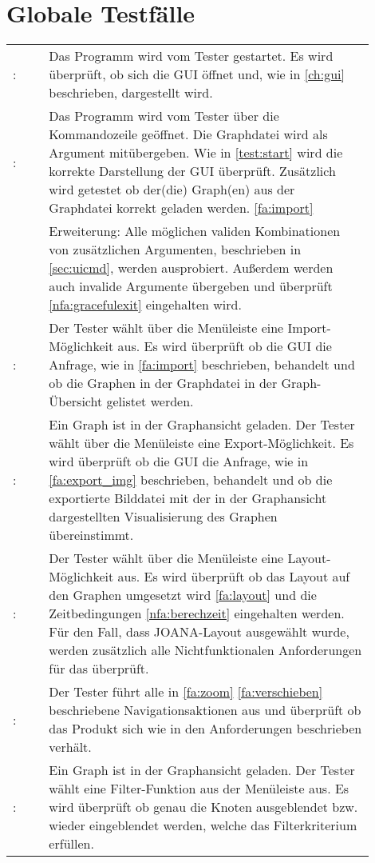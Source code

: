 \chapter{Globale Testfälle}

\setcounter{tnr}{10}
\newcommand{\testno}{\ifnum\value{tnr}<10 00\else\ifnum\value{tnr}<100 0\fi\fi\arabic{tnr}\addtocounter{tnr}{10}}
\newcommand\test[2]{\namedlabel{test:#1}{\textbf{/T\testno/}}: & #2 \\ [1ex] }
\newcommand\etest[3]{\namedlabel{test:#1}{\textbf{/T\testno/}}: & #2 \\ & Erweiterung: #3 \\ [1ex] }

\begin{tabular}{lp{0.9\linewidth}}
  \test{start}{Das Programm wird vom Tester gestartet.
    Es wird überprüft, ob sich die GUI öffnet und, wie in \ref{ch:gui} beschrieben, dargestellt wird.}
  \etest{startcmd}{Das Programm wird vom Tester über die Kommandozeile geöffnet.
    Die Graphdatei wird als Argument mitübergeben.
    Wie in \ref{test:start} wird die korrekte Darstellung der GUI überprüft.
    Zusätzlich wird getestet ob der(die) Graph(en) aus der Graphdatei korrekt geladen werden. \ref{fa:import}}
    {Alle möglichen validen Kombinationen von zusätzlichen Argumenten, beschrieben in \ref{sec:uicmd}, werden ausprobiert.
    Außerdem werden auch invalide Argumente übergeben und überprüft \ref{nfa:gracefulexit} eingehalten wird.}
  \test{import}{Der Tester wählt über die Menüleiste eine Import-Möglichkeit aus.
    Es wird überprüft ob die GUI die Anfrage, wie in \ref{fa:import} beschrieben,
    behandelt und ob die Graphen in der Graphdatei in der Graph-Übersicht gelistet werden.}
  \test{export}{Ein Graph ist in der Graphansicht geladen.
    Der Tester wählt über die Menüleiste eine Export-Möglichkeit.
    Es wird überprüft ob die GUI die Anfrage, wie in \ref{fa:export_img} beschrieben,
    behandelt und ob die exportierte Bilddatei mit der in der Graphansicht dargestellten Visualisierung des Graphen übereinstimmt.}
  \test{layouten}{Der Tester wählt über die Menüleiste eine Layout-Möglichkeit aus.
    Es wird überprüft ob das Layout auf den Graphen umgesetzt wird \ref{fa:layout}
    und die Zeitbedingungen \ref{nfa:berechzeit} eingehalten werden.
    Für den Fall, dass JOANA-Layout ausgewählt wurde,
    werden zusätzlich alle Nichtfunktionalen Anforderungen für das \nameref{sec:nfajoana} überprüft.}
  \test{navigation}{Der Tester führt alle in \ref{fa:zoom} \ref{fa:verschieben} beschriebene Navigationsaktionen aus
    und überprüft ob das Produkt sich wie in den Anforderungen beschrieben verhält.}
  \test{filter}{Ein Graph ist in der Graphansicht geladen.
    Der Tester wählt eine Filter-Funktion aus der Menüleiste aus.
    Es wird überprüft ob genau die Knoten ausgeblendet bzw. wieder eingeblendet werden, welche das Filterkriterium erfüllen.}
\end{tabular}
